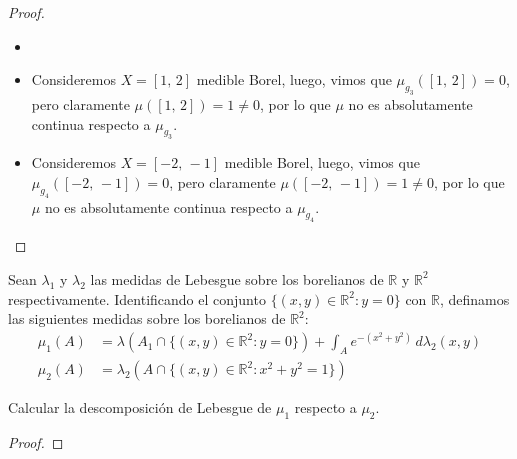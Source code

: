 \documentclass[12pt]{article}
\newenvironment{statement}[2][Ejercicio]{\begin{trivlist}
\item[\hskip \labelsep {\bfseries #1}\hskip \labelsep {\bfseries #2.}]}{\end{trivlist}}
\begin{document}
\begin{proof}
\begin{itemize}
\begin{itemize}
                  \item[(ii)]
                  \item[(iii)] Consideremos $X = [1\text{, }2]$ medible Borel, luego, vimos que $\mu_{g_3}([1\text{, }2]) = 0$, pero claramente $\mu([1\text{, }2]) = 1 \neq 0$, por lo que $\mu$ no es absolutamente continua respecto a $\mu_{g_3}$.
                  \item[(iv)] Consideremos $X = [-2\text{, }-1]$ medible Borel, luego, vimos que $\mu_{g_4}([-2\text{, }-1]) = 0$, pero claramente $\mu([-2\text{, }-1]) = 1 \neq 0$, por lo que $\mu$ no es absolutamente continua respecto a $\mu_{g_4}$.
              \end{itemize}
    \end{itemize}
\end{proof}

\begin{statement}{11}
    Sean $\lambda_1$ y $\lambda_2$ las medidas de Lebesgue sobre los borelianos de $\mathbb{R}$ y $\mathbb{R}^2$ respectivamente. Identificando el conjunto $\{(x, y) \in \mathbb{R}^2 : y = 0\}$ con $\mathbb{R}$, definamos las siguientes medidas sobre los borelianos de $\mathbb{R}^2$:
    \begin{align*}
        \mu_1(A) & = \lambda(A_1 \cap \{(x, y) \in \mathbb{R}^2 : y = 0\}) + \int_A e^{-(x^2 + y^2)} \, d\lambda_2(x, y) \\
        \mu_2(A) & = \lambda_2(A \cap \{(x, y) \in \mathbb{R}^2 : x^2 + y^2 = 1\})
    \end{align*}

    Calcular la descomposición de Lebesgue de $\mu_1$ respecto a $\mu_2$.
\end{statement}

\begin{proof}

\end{proof}
\end{document}
